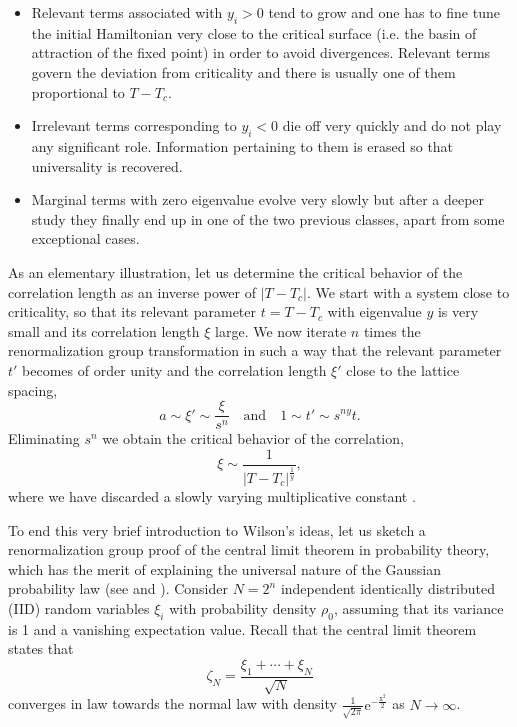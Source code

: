 \documentclass[12pt,here,feynmf]{article}
\begin{document}
\begin{itemize}
\item
Relevant terms associated with 
$y_i>0$ tend to grow and one has to fine tune the initial Hamiltonian very close to the critical surface (i.e. the basin of attraction of the fixed point) in order to avoid divergences. Relevant terms govern the deviation from criticality and there is usually one of them proportional to $T-T_{c}$.

\item
Irrelevant terms corresponding to $y_{i}<0$ die off very quickly and do not play any significant role.  Information pertaining to them is erased so that universality is recovered.
\item
Marginal terms with zero eigenvalue evolve very slowly but after a deeper study they finally end up in one of the two previous classes, apart from some exceptional cases.
\end{itemize}   

As an elementary illustration, let us determine the critical behavior of the correlation length as an inverse power of $|T-T_{c}|$. We start with a system close to criticality, so that its relevant parameter $t=T-T_{c}$ with eigenvalue $y$ is very small and its correlation length $\xi$ large. We now iterate $n$ times the renormalization group transformation in such a way that the relevant parameter $t'$ becomes of order unity and the correlation length $\xi'$ close to the lattice spacing,
\begin{equation}
a\sim\xi'\sim\frac{\xi}{s^{n}}\quad\mathrm{and}\quad1\sim t'\sim s^{ny}t.
\end{equation}
Eliminating $s^{n}$ we obtain the critical behavior of the correlation, 
\begin{equation}
\xi\sim\frac{1}{|T-T_{c}|^{\frac{1}{y}}},
\end{equation}
where we have discarded a slowly varying  multiplicative constant . 


To end this very brief introduction to Wilson's ideas, let us sketch a renormalization group proof of the central limit theorem in probability theory, which has the merit of explaining the universal nature of the Gaussian probability law (see \cite{sinai} and \cite{jona}). Consider $N=2^{n}$ independent identically distributed (IID) random variables $\xi_{i}$ with probability density $\rho_{0}$, assuming that its variance is 1 and a vanishing expectation value. Recall that the central limit theorem states that  
\begin{equation}
\zeta_{N}=\frac{\xi_{1}+\cdots+\xi_{N}}{\sqrt{N}}
\end{equation}
converges in law towards the normal law with density $\frac{1}{\sqrt{2\pi}}\mathrm{e^{-\frac{x^{2}}{2}}}$ as $N\rightarrow\infty$.
 
\end{document}
